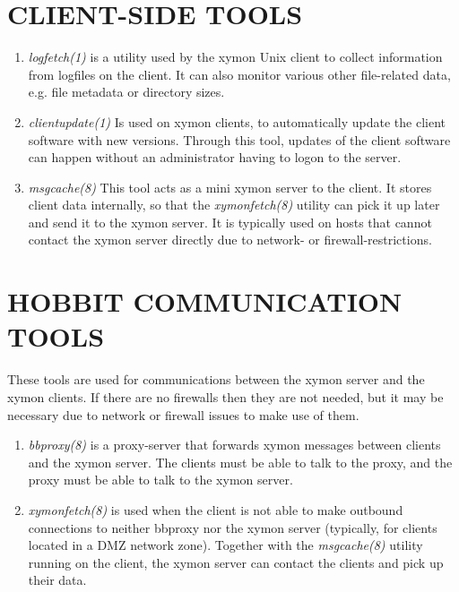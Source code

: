 \section{CLIENT-SIDE TOOLS}
\begin{enumerate}

 \item \emph{logfetch(1)}
 is a utility used by the xymon Unix client to collect information
 from logfiles on the client. It can also monitor various other
 file-related data, e.g. file metadata or directory sizes. 

 \item \emph{clientupdate(1)}
 Is used on xymon clients, to automatically update the client
 software with new versions. Through this tool, updates of the client
 software can happen without an administrator having to logon to the
 server. 

 \item \emph{msgcache(8)}
 This tool acts as a mini xymon server to the client. It stores
 client data internally, so that the \emph{xymonfetch(8)} utility can
 pick it up later and send it to the xymon server. It is typically
 used on hosts that cannot contact the xymon server directly due to
 network- or firewall-restrictions. 

\end{enumerate}

\section{HOBBIT COMMUNICATION TOOLS}

 These tools are used for communications between the xymon server and
 the xymon clients. If there are no firewalls then they are not
 needed, but it may be necessary due to network or firewall issues to
 make use of them. 

\begin{enumerate}
\item \emph{bbproxy(8)}
 is a proxy-server that forwards xymon messages between clients and
 the xymon server. The clients must be able to talk to the proxy, and
 the proxy must be able to talk to the xymon server. 



\item \emph{xymonfetch(8)}
 is used when the client is not able to make outbound connections to
 neither bbproxy nor the xymon server (typically, for clients located
 in a DMZ network zone). Together with the \emph{msgcache(8)} utility
 running on the client, the xymon server can contact the clients and
 pick up their data. 

\end{enumerate}
 
